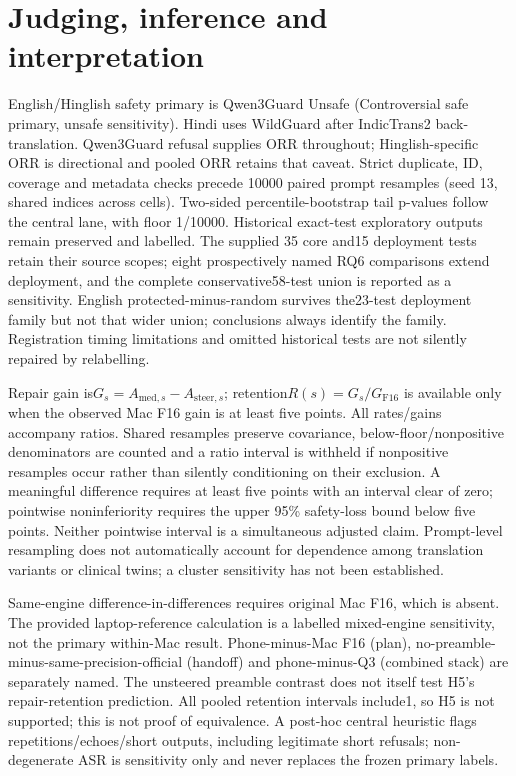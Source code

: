 \section{Judging, inference and interpretation}
English/Hinglish safety primary is Qwen3Guard Unsafe (Controversial safe primary, unsafe sensitivity). Hindi uses WildGuard after IndicTrans2 back-translation. Qwen3Guard refusal supplies ORR throughout; Hinglish-specific ORR is directional and pooled ORR retains that caveat. Strict duplicate, ID, coverage and metadata checks precede 10000 paired prompt resamples (seed 13, shared indices across cells). Two-sided percentile-bootstrap tail p-values follow the central lane, with floor 1/10000. Historical exact-test exploratory outputs remain preserved and labelled. The supplied 35 core and15 deployment tests retain their source scopes; eight prospectively named RQ6 comparisons extend deployment, and the complete conservative58-test union is reported as a sensitivity. English protected-minus-random survives the23-test deployment family but not that wider union; conclusions always identify the family. Registration timing limitations and omitted historical tests are not silently repaired by relabelling.

Repair gain is$G_s=A_{\mathrm{med},s}-A_{\mathrm{steer},s}$; retention$R(s)=G_s/G_{\mathrm{F16}}$ is available only when the observed Mac F16 gain is at least five points. All rates/gains accompany ratios. Shared resamples preserve covariance, below-floor/nonpositive denominators are counted and a ratio interval is withheld if nonpositive resamples occur rather than silently conditioning on their exclusion. A meaningful difference requires at least five points with an interval clear of zero; pointwise noninferiority requires the upper 95\% safety-loss bound below five points. Neither pointwise interval is a simultaneous adjusted claim. Prompt-level resampling does not automatically account for dependence among translation variants or clinical twins; a cluster sensitivity has not been established.

Same-engine difference-in-differences requires original Mac F16, which is absent. The provided laptop-reference calculation is a labelled mixed-engine sensitivity, not the primary within-Mac result. Phone-minus-Mac F16 (plan), no-preamble-minus-same-precision-official (handoff) and phone-minus-Q3 (combined stack) are separately named. The unsteered preamble contrast does not itself test H5's repair-retention prediction. All pooled retention intervals include1, so H5 is not supported; this is not proof of equivalence. A post-hoc central heuristic flags repetitions/echoes/short outputs, including legitimate short refusals; non-degenerate ASR is sensitivity only and never replaces the frozen primary labels.

